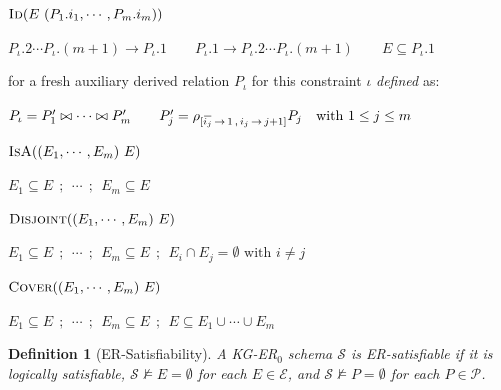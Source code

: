 \documentclass[10pt]{article}
\newtheorem{definition}{Definition}
\newcommand{\ols}[1]{\mskip.5\thinmuskip\overline{\mskip-.5\thinmuskip {#1} \mskip-.5\thinmuskip}\mskip.5\thinmuskip} %
\begin{document}

\vspace{.5ex}\noindent
$\textsc{Id}(E\ (P_1.i_1, \cdots , P_m.i_m))$

$
P_\iota.2 \cdots P_\iota.(m\!+\!1)\rightarrow P_\iota.1
\qquad
P_\iota.1\rightarrow P_\iota.2\cdots P_\iota.(m\!+\!1)
\qquad
E\subseteq P_\iota.1 
$

for a fresh auxiliary derived relation \(P_\iota\) for this constraint \(\iota\)
\textit{defined} as:

\qquad$
P_\iota=P_1'\bowtie\cdots\bowtie P'_m 
\qquad
P'_j=\rho_{[\ols{i_j}\,\rightarrow\, 1\,,\,{i_j}\,\rightarrow\, j+1]}P_j
\quad\text{with }1\leq j\leq m
$

\noindent
$\textsc{IsA}((E_1,\cdots,E_m)\ E)$

$E_1\subseteq E ~~;~~\cdots ~~;~~E_m\subseteq E$

\noindent
$\textsc{Disjoint}((E_1,\cdots,E_m)\ E)$ 
 
$E_1\subseteq E ~~;~~\cdots ~~;~~E_m\subseteq E ~~;~~
E_i\cap E_j=\emptyset \text{ with } i\neq j$

\noindent
$\textsc{Cover}((E_1,\cdots,E_m)\ E)$

$E_1\subseteq E ~~;~~\cdots ~~;~~E_m\subseteq E ~~;~~
E\subseteq E_1 \cup\cdots\cup E_m$



\begin{definition}[ER-Satisfiability]
A KG-ER$_0$ schema \(\mathcal S\) is \emph{ER-satisfiable} if it is
logically satisfiable, \(\mathcal S\not\models E=\emptyset\) for each
\(E\in\mathcal E\), and \(\mathcal S\not\models P=\emptyset\) for each
\(P\in\mathcal P\).
\end{definition}
\end{document}
